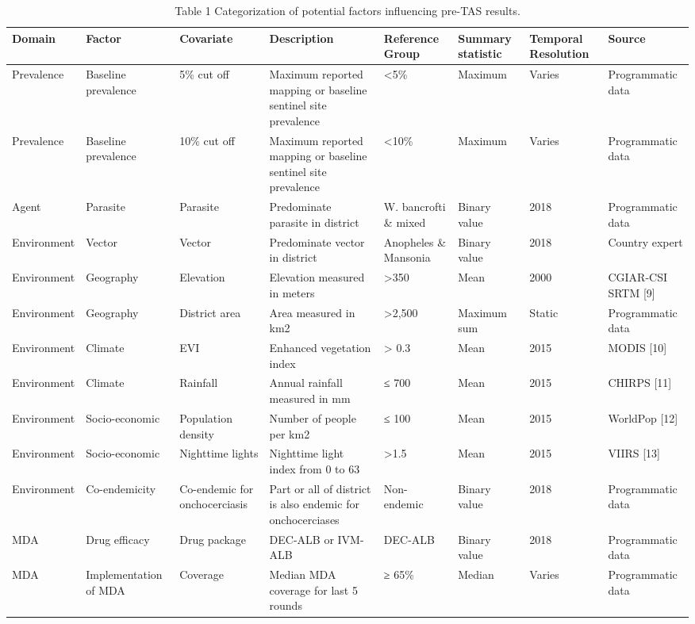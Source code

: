 \documentclass[11pt,a4paper]{article}
\begin{document}
\begin{table}[h]
\caption{Table 1 Categorization of potential factors influencing pre-TAS results.}
\begin{tabular}{|l|l|l|l|l|l|l|l|}
\hline
Domain & Factor & Covariate & Description & Reference Group & Summary statistic & Temporal Resolution & Source \\ \hline
Prevalence & Baseline prevalence & 5\% cut off & Maximum reported mapping or baseline sentinel site prevalence & <5\% & Maximum & Varies & Programmatic data \\ \hline
Prevalence & Baseline prevalence & 10\% cut off & Maximum reported mapping or baseline sentinel site prevalence & <10\% & Maximum & Varies & Programmatic data \\ \hline
Agent & Parasite & Parasite & Predominate parasite in district & W. bancrofti \& mixed & Binary value & 2018 & Programmatic data \\ \hline
Environment & Vector & Vector & Predominate vector in district & Anopheles \& Mansonia & Binary value & 2018 & Country expert \\ \hline
Environment & Geography & Elevation & Elevation measured in meters & >350 & Mean & 2000 & CGIAR-CSI SRTM [9] \\ \hline
Environment & Geography & District area & Area measured in km2 & >2,500 & Maximum sum & Static & Programmatic data \\ \hline
Environment & Climate & EVI & Enhanced vegetation index & > 0.3 & Mean & 2015 & MODIS [10] \\ \hline
Environment & Climate & Rainfall & Annual rainfall measured in mm & ≤ 700 & Mean & 2015 & CHIRPS [11] \\ \hline
Environment & Socio-economic & Population density & Number of people per km2 & ≤ 100 & Mean & 2015 & WorldPop [12] \\ \hline
Environment & Socio-economic & Nighttime lights & Nighttime light index from 0 to 63 & >1.5 & Mean & 2015 & VIIRS [13] \\ \hline
Environment & Co-endemicity & Co-endemic for onchocerciasis & Part or all of district is also endemic for onchocerciases & Non-endemic & Binary value & 2018 & Programmatic data \\ \hline
MDA & Drug efficacy & Drug package & DEC-ALB or IVM-ALB & DEC-ALB & Binary value & 2018 & Programmatic data \\ \hline
MDA & Implementation of MDA & Coverage & Median MDA coverage for last 5 rounds & ≥ 65\% & Median & Varies & Programmatic data \\ \hline

\end{tabular}
\end{table}
\end{document}
